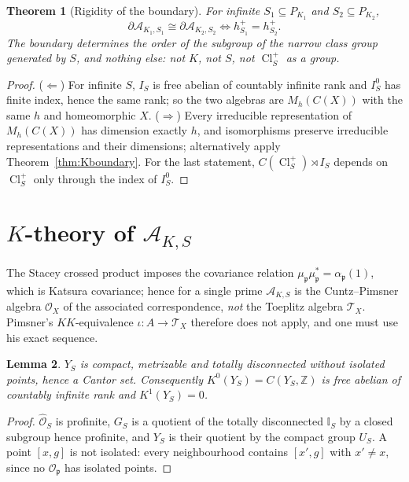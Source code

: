 \documentclass[11pt]{amsart}
\numberwithin{equation}{section}
\newtheorem{theorem}{Theorem}[section]
\newtheorem{lemma}[theorem]{Lemma}
\theoremstyle{definition}
\theoremstyle{remark}
\newcommand{\Z}{\mathbb{Z}}
\newcommand{\cA}{\mathcal{A}}
\newcommand{\cO}{\mathcal{O}}
\newcommand{\hO}{\widehat{\cO}}
\newcommand{\cT}{\mathcal{T}}
\newcommand{\pp}{\mathfrak{p}}
\newcommand{\Idl}{\mathbb{I}}
\newcommand{\Cl}{\operatorname{Cl}}
\begin{document}
\begin{theorem}[Rigidity of the boundary]\label{thm:rigid}
For infinite $S_1\subseteq P_{K_1}$ and $S_2\subseteq P_{K_2}$,
\[
\partial\cA_{K_1,S_1}\cong\partial\cA_{K_2,S_2}\iff h^+_{S_1}=h^+_{S_2} .
\]
The boundary determines the order of the subgroup of the narrow class group generated by
$S$, and nothing else: not $K$, not $S$, not $\Cl^+_S$ as a group.
\end{theorem}

\begin{proof}
($\Leftarrow$) For infinite $S$, $I_S$ is free abelian of countably infinite rank and
$I_S^0$ has finite index, hence the same rank; so the two algebras are
$M_h(C(X))$ with the same $h$ and homeomorphic $X$.
($\Rightarrow$) Every irreducible representation of $M_h(C(X))$ has dimension exactly $h$,
and isomorphisms preserve irreducible representations and their dimensions; alternatively
apply Theorem~\ref{thm:Kboundary}. For the last statement, $C(\Cl^+_S)\rtimes I_S$ depends
on $\Cl^+_S$ only through the index of $I_S^0$.
\end{proof}

\section{$K$-theory of $\cA_{K,S}$}

The Stacey crossed product imposes the covariance relation $\mu_\pp\mu_\pp^*=\alpha_\pp(1)$,
which is Katsura covariance; hence for a single prime $\cA_{K,S}$ is the Cuntz--Pimsner
algebra $\cO_X$ of the associated correspondence, \emph{not} the Toeplitz algebra $\cT_X$.
Pimsner's $KK$-equivalence $\iota:A\to\cT_X$ therefore does not apply, and one must use his
exact sequence.

\begin{lemma}\label{lem:cantorspace}
$Y_S$ is compact, metrizable and totally disconnected without isolated points, hence a
Cantor set. Consequently $K^0(Y_S)=C(Y_S,\Z)$ is free abelian of countably infinite rank and
$K^1(Y_S)=0$.
\end{lemma}

\begin{proof}
$\hO_S$ is profinite, $G_S$ is a quotient of the totally disconnected $\Idl_S$ by a closed
subgroup hence profinite, and $Y_S$ is their quotient by the compact group $U_S$. A point
$[x,g]$ is not isolated: every neighbourhood contains $[x',g]$ with $x'\ne x$, since no
$\cO_\pp$ has isolated points.
\end{proof}
\end{document}
